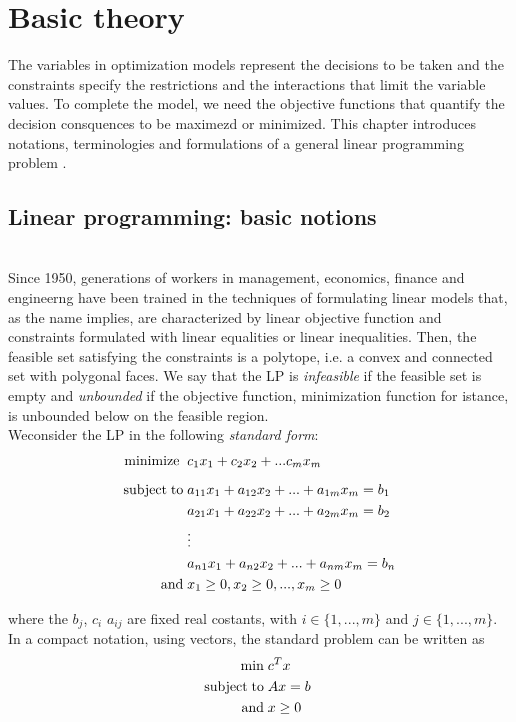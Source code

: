 \documentclass[a4paper,10 pt,titlepage,twoside]{book}
\theoremstyle{plain}
\theoremstyle{definition}
\theoremstyle{remark}
\begin{document}
%
\chapter{Basic theory}
The variables in optimization models represent the decisions to be taken and the constraints specify the restrictions and the interactions that limit the variable values.
To complete the model, we need the objective functions that quantify the decision consquences to be maximezd or minimized. This chapter introduces notations, terminologies and formulations of a general linear programming problem .

\section{Linear programming: basic notions}

 \\
Since 1950, generations of workers in management, economics, finance and engineerng have been trained in the techniques of formulating linear models that,
as the name implies, are characterized by linear objective function and constraints formulated with linear equalities or linear inequalities.
Then, the feasible set satisfying the constraints is a polytope, i.e. a convex and connected set with polygonal faces. We say that the LP is \textit{infeasible} if the feasible set is empty and \textit{unbounded} if the objective function, minimization function for istance, is unbounded below on the feasible region.\\
Weconsider the LP in the following \textit{standard form}:
\begin{alignat*}{1}\label{eq:stdform}
\text{minimize\;}\; &c_1 x_1 + c_2 x_2+ ... c_m x_m\\[2mm]
\text{subject\;to\;} &a_{11} x_1 + a_{12} x_2+ ... +a_{1m}x_m = b_1\\
&a_{21} x_1 + a_{22} x_2 + ... + a_{2m} x_m= b_2\\
&\vdots\\
&a_{n1} x_1 + a_{n2} x_2 + ... + a_{nm} x_m= b_n\\
\text{and}\; & x_1 \geq 0 , x_2 \geq 0, ... , x_m \geq 0
 \end{alignat*}

where the $b_{j}$, $c_{i}$  $a_{ij}$ are fixed real costants, with $i \in\{1,...,m\}$ and $j\in\{1,...,m\}$.\\ In a compact notation, using vectors, the standard problem can be written as
\begin{equation}\label{(Prim)}
 \begin{split}
\min\;&c^{T}x\\
\text{subject\;to\;}&Ax= b\;\\\text{and\;}&x\geq0
 \end{split}
\end{equation}
\end{document}
